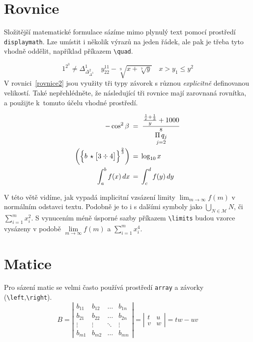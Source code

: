 \documentclass[twocolumn, 11pt, a4paper]{article}[16.03.2023]
\begin{document}
\section{Rovnice}
    Složitější matematické formulace sázíme mimo plynulý text pomocí prostředí \verb|displaymath|.
    Lze umístit i několik výrazů na jeden řádek, ale pak je třeba tyto vhodně oddělit, například příkazem \verb|\quad|.

        \begin{displaymath}
            1^{2^{3}} \ne \Delta_{\Delta_{\Delta^3}^2}^1 \quad y^{11}_{22}-\sqrt[9]{x+\sqrt[7]{y}} \quad x > y_1 \leq y^2
        \end{displaymath}
    V rovnici~\eqref{rovnice2} jsou využity tři typy závorek s různou \emph{explicitně} definovanou velikostí.
    Také nepřehlédněte, že následující tři rovnice mají zarovnaná rovnítka, a použijte k~tomuto účelu vhodné prostředí.

\begin{align}
        -\cos^{2} \beta \;&=\;\frac{\frac{\frac{1}{x}+\frac{1}{3}}{y}+1000}{\underset{j=2}{\overset{8}{\Pi\,q_j}}} \\
        \biggl(\Bigl\{ b\,\star \bigl[ 3\div 4\bigr] \Bigr\}^{\frac{2}{3}}\biggr)\,&=\,\log_{10}{x} \label{rovnice2}\\
        \int_{a}^{b}f\!\left(x\right)dx \,&=\, \int_{c}^{d}f\!\left(y\right)dy \label{rovnice3}
\end{align}

V této větě vidíme, jak vypadá implicitní vzsázení limity $\lim_{m\rightarrow\infty} f(m)$ v normálním odstavci textu.
Podobně je to i s dalšími symboly jako $\bigcup_{N\in\mathcal{M}} N$, či $\sum_{i=1}^{m} x^2_i$. 
S vynucením méně úsporné sazby příkazem \verb|\limits| budou vzorce vysázeny v podobě
$\lim\limits_{m\rightarrow\infty}f(m)$ a $\sum\limits_{i=1}^{m}x^4_i$.

\section{Matice}
Pro sázení matic se velmi často používá prostředí \verb|array| a závorky (\verb|\left|,\verb|\right|).
$$B=\left|
\begin{array}{cccc}
    b_{11} & b_{12} & \dots & b_{1n}\\
    b_{21} & b_{22} & \dots & b_{2n}\\
    \vdots & \vdots & \ddots & \vdots\\
    b_{m1} & b_{m2} & \dots & b_{mn}
\end{array}
\right| = \left|
\begin{array}{cc}
    t & u\\
    v & w
\end{array}
\right| = tw - uv$$ 
\end{document}
